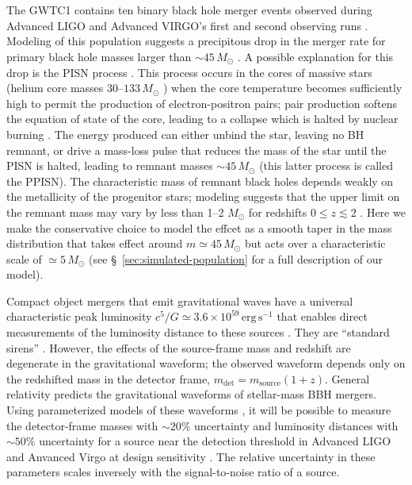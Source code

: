 \documentclass[modern]{aastex62}
\newcommand{\MPISN}{45 \, \MSun{}}
\newcommand{\MTaperScale}{5 \, \MSun{}}
\newcommand{\MSun}{M_\odot}
\begin{document}
\section*{ }

The \ac{GWTC1} contains ten binary black hole merger events observed during
Advanced LIGO and Advanced VIRGO's first and second observing runs
\citep{GWTC-1}. Modeling of this population suggests a precipitous drop in the
merger rate for primary black hole masses larger than $\sim \MPISN{}$
\citep{Fishbach2017,GWTC-1}.  A possible explanation for this drop is the
\ac{PISN} process
\citep{Fowler1964,Rakavy1967,Bond1984,Heger2002,Belczynski2016,Woosley2017,Spera2017}.
This process occurs in the cores of massive stars (helium core masses $30$--$133
\, \MSun$ \citep{Woosley2017}) when the core temperature becomes sufficiently
high to permit the production of electron-positron pairs; pair production
softens the equation of state of the core, leading to a collapse which is halted
by nuclear burning \citep{Heger2002}.  The energy produced can either unbind the
star, leaving no \ac{BH} remnant, or drive a mass-loss pulse that reduces the
mass of the star until the \ac{PISN} is halted, leading to remnant masses $\sim
\MPISN{}$ (this latter process is called the \ac{PPISN}). The characteristic
mass of remnant black holes depends weakly on the metallicity of the progenitor
stars; modeling suggests that the upper limit on the remnant mass may vary by
less than 1--2 $\MSun$ for redshifts $0 \leq z \lesssim 2$
\citep{Belczynski2016,Mapelli2017}.  Here we make the conservative choice to
model the effcet as a smooth taper in the mass distribution that takes effect
around $m \simeq \MPISN{}$ but acts over a characteristic scale of $\simeq
\MTaperScale$ (see \S\ \ref{sec:simulated-population} for a full description of
our model).

Compact object mergers that emit gravitational waves have a universal
characteristic peak luminosity $c^5/G \simeq 3.6 \times 10^{59} \, \mathrm{erg}
\, \mathrm{s}^{-1}$ that enables direct measurements of the luminosity distance
to these sources \citep{Schutz1986}.  They are ``standard sirens''
\citep{Holz2005}. However, the effects of the source-frame mass and redshift are
degenerate in the gravitational waveform; the observed waveform depends only on
the redshifted mass in the detector frame, $m_\mathrm{det} = m_\mathrm{source}
(1 + z)$. General relativity predicts the gravitational waveforms of
stellar-mass \ac{BBH} mergers.  Using parameterized models of these waveforms
\citep{Taracchini2014,Kahn2016,Bohe2017,Chatziioannou2017}, it will be possible
to measure the detector-frame masses with $\sim 20\%$ uncertainty and luminosity
distances \citep{Hogg1999} with $\sim 50\%$ uncertainty for a source near the
detection threshold in Advanced LIGO and Anvanced Virgo at design sensitivity
\citep{Vitale2017}.  The relative uncertainty in these parameters scales
inversely with the signal-to-noise ratio of a source.
\end{document}
